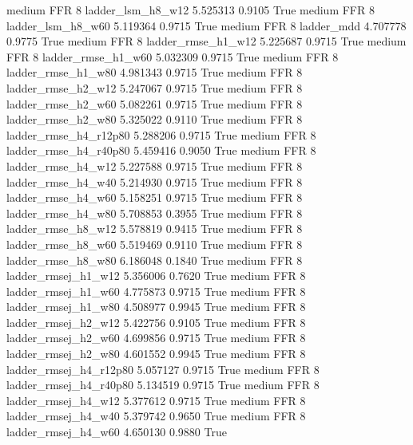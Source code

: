     medium      FFR                 8      ladder_lsm_h8_w12   5.525313      0.9105    True
    medium      FFR                 8      ladder_lsm_h8_w60   5.119364      0.9715    True
    medium      FFR                 8             ladder_mdd   4.707778      0.9775    True
    medium      FFR                 8     ladder_rmse_h1_w12   5.225687      0.9715    True
    medium      FFR                 8     ladder_rmse_h1_w60   5.032309      0.9715    True
    medium      FFR                 8     ladder_rmse_h1_w80   4.981343      0.9715    True
    medium      FFR                 8     ladder_rmse_h2_w12   5.247067      0.9715    True
    medium      FFR                 8     ladder_rmse_h2_w60   5.082261      0.9715    True
    medium      FFR                 8     ladder_rmse_h2_w80   5.325022      0.9110    True
    medium      FFR                 8  ladder_rmse_h4_r12p80   5.288206      0.9715    True
    medium      FFR                 8  ladder_rmse_h4_r40p80   5.459416      0.9050    True
    medium      FFR                 8     ladder_rmse_h4_w12   5.227588      0.9715    True
    medium      FFR                 8     ladder_rmse_h4_w40   5.214930      0.9715    True
    medium      FFR                 8     ladder_rmse_h4_w60   5.158251      0.9715    True
    medium      FFR                 8     ladder_rmse_h4_w80   5.708853      0.3955    True
    medium      FFR                 8     ladder_rmse_h8_w12   5.578819      0.9415    True
    medium      FFR                 8     ladder_rmse_h8_w60   5.519469      0.9110    True
    medium      FFR                 8     ladder_rmse_h8_w80   6.186048      0.1840    True
    medium      FFR                 8    ladder_rmsej_h1_w12   5.356006      0.7620    True
    medium      FFR                 8    ladder_rmsej_h1_w60   4.775873      0.9715    True
    medium      FFR                 8    ladder_rmsej_h1_w80   4.508977      0.9945    True
    medium      FFR                 8    ladder_rmsej_h2_w12   5.422756      0.9105    True
    medium      FFR                 8    ladder_rmsej_h2_w60   4.699856      0.9715    True
    medium      FFR                 8    ladder_rmsej_h2_w80   4.601552      0.9945    True
    medium      FFR                 8 ladder_rmsej_h4_r12p80   5.057127      0.9715    True
    medium      FFR                 8 ladder_rmsej_h4_r40p80   5.134519      0.9715    True
    medium      FFR                 8    ladder_rmsej_h4_w12   5.377612      0.9715    True
    medium      FFR                 8    ladder_rmsej_h4_w40   5.379742      0.9650    True
    medium      FFR                 8    ladder_rmsej_h4_w60   4.650130      0.9880    True

